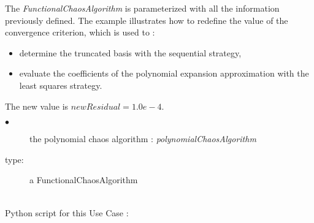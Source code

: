 The \emph{FunctionalChaosAlgorithm} is parameterized with all the information previously defined. The example illustrates how to redefine the value of the convergence criterion, which is used to :

\begin{itemize}
\item determine the truncated basis with the sequential strategy,
\item evaluate the coefficients of the polynomial expansion approximation with the least squares strategy.
\end{itemize}
The new value is $newResidual = 1.0e-4$.\\


             {
               \begin{description}
               \item[$\bullet$] the  polynomial chaos algorithm : {\itshape polynomialChaosAlgorithm}
               \item[type:] a FunctionalChaosAlgorithm
               \end{description}
             }

             \textspace\\
             Python script for this Use Case :

